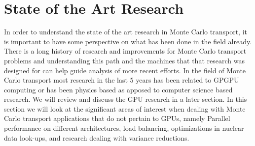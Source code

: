 \section{State of the Art Research}

In order to understand the state of the art research in Monte Carlo transport, it is important to have some perspective on what has been done in the field already.
%
There is a long history of research and improvements for Monte Carlo transport problems and understanding this path and the machines that that research was designed for can help guide analysis of more recent efforts.
%
In the field of Monte Carlo transport most research in the last 5 years has been related to GPGPU computing or has been physics based as apposed to computer science based research.
%
We will review and discuss the GPU research in a later section.
%
In this section we will look at the significant areas of interest when dealing with Monte Carlo transport applications that do not pertain to GPUs, namely Parallel performance on different architectures, load balancing, optimizations in nuclear data look-ups, and research dealing with variance reductions.
%
